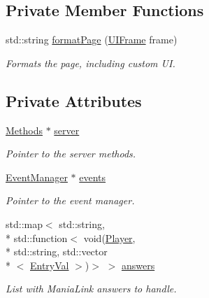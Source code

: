 \subsection*{Private Member Functions}
\begin{DoxyCompactItemize}
\item 
std\-::string \hyperlink{classUIManager_a2bfbf770019b05d660ba8f177993c16a}{format\-Page} (\hyperlink{structUIFrame}{U\-I\-Frame} frame)
\begin{DoxyCompactList}\small\item\em Formats the page, including custom U\-I. \end{DoxyCompactList}\end{DoxyCompactItemize}
\subsection*{Private Attributes}
\begin{DoxyCompactItemize}
\item 
\hypertarget{classUIManager_a33db2c26db770d39d59625138097cf4b}{\hyperlink{classMethods}{Methods} $\ast$ \hyperlink{classUIManager_a33db2c26db770d39d59625138097cf4b}{server}}\label{classUIManager_a33db2c26db770d39d59625138097cf4b}

\begin{DoxyCompactList}\small\item\em Pointer to the server methods. \end{DoxyCompactList}\item 
\hypertarget{classUIManager_aaa87b49b6a0329d8502cfb8e2ca9ab59}{\hyperlink{classEventManager}{Event\-Manager} $\ast$ \hyperlink{classUIManager_aaa87b49b6a0329d8502cfb8e2ca9ab59}{events}}\label{classUIManager_aaa87b49b6a0329d8502cfb8e2ca9ab59}

\begin{DoxyCompactList}\small\item\em Pointer to the event manager. \end{DoxyCompactList}\item 
\hypertarget{classUIManager_a06f9c65d5f61810311f6e7cd53bce55f}{std\-::map$<$ std\-::string, \\*
std\-::function$<$ void(\hyperlink{structPlayer}{Player}, \\*
std\-::string, std\-::vector\\*
$<$ \hyperlink{structEntryVal}{Entry\-Val} $>$)$>$ $>$ \hyperlink{classUIManager_a06f9c65d5f61810311f6e7cd53bce55f}{answers}}\label{classUIManager_a06f9c65d5f61810311f6e7cd53bce55f}

\begin{DoxyCompactList}\small\item\em List with Mania\-Link answers to handle. \end{DoxyCompactList}\end{DoxyCompactItemize}


